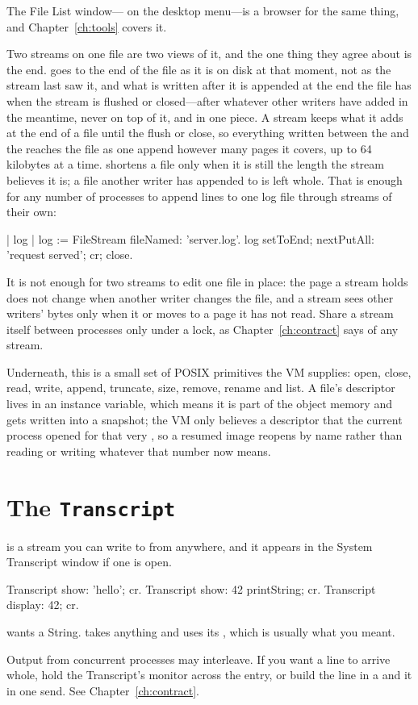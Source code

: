 The File List window--- on the desktop menu---is a browser for
the same thing, and Chapter~\ref{ch:tools} covers it.

Two streams on one file are two views of it, and the one thing they agree
about is the end.  goes to the end of the file as it is on disk
at that moment, not as the stream last saw it, and what is written after it
is appended at the end the file has when the stream is flushed or
closed---after whatever other writers have added in the meantime, never on
top of it, and in one piece. A stream keeps what it adds at the end of a
file until the flush or close, so everything written between the
 and the  reaches the file as one append however
many pages it covers, up to 64 kilobytes at a time. 
shortens a file only when it is still the length the stream believes it is;
a file another writer has appended to is left whole. That is enough for any
number of processes to append lines to one log file through streams of their
own:

\begin{st}
| log |
log := FileStream fileNamed: 'server.log'.
log setToEnd; nextPutAll: 'request served'; cr; close.
\end{st}

It is not enough for two streams to edit one file in place: the page a
stream holds does not change when another writer changes the file, and a
stream sees other writers' bytes only when it  or moves to a
page it has not read. Share a stream itself between processes only under a
lock, as Chapter~\ref{ch:contract} says of any stream.

Underneath, this is a small set of POSIX primitives the VM supplies: open,
close, read, write, append, truncate, size, remove, rename and list. A file's
descriptor lives in an instance variable, which means it is part of the object
memory and gets written into a snapshot; the VM only believes a descriptor
that the current process opened for that very , so a resumed image
reopens by name rather than reading or writing whatever that number now
means.

\section{The \texttt{Transcript}}

 is a stream you can write to from anywhere, and it appears in
the System Transcript window if one is open.

\begin{st}
Transcript show: 'hello'; cr.
Transcript show: 42 printString; cr.
Transcript display: 42; cr.
\end{st}

 wants a String.  takes anything and uses its
, which is usually what you meant.

\begin{stwarn}
Output from concurrent processes may interleave. If you want a line to arrive
whole, hold the Transcript's monitor across the entry, or build the line in a
 and  it in one send. See
Chapter~\ref{ch:contract}.
\end{stwarn}
